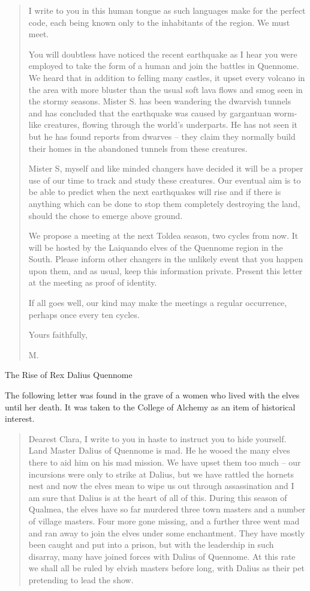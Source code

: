 \begin{multicols}{2}
\begin{quotation}
	I write to you in this human tongue as such languages make for the perfect code, each being known only to the inhabitants of the region.  We must meet.

	You will doubtless have noticed the recent earthquake as I hear you were employed to take the form of a human and join the battles in Quennome.  We heard that in addition to felling many castles, it upset every volcano in the area with more bluster than the usual soft lava flows and smog seen in the stormy seasons.  Mister S. has been wandering the dwarvish tunnels and has concluded that the earthquake was caused by gargantuan worm-like creatures, flowing through the world's underparts.  He has not seen it but he has found reports from dwarves -- they claim they normally build their homes in the abandoned tunnels from these creatures.

	Mister S, myself and like minded changers have decided it will be a proper use of our time to track and study these creatures.  Our eventual aim is to be able to predict when the next earthquakes will rise and if there is anything which can be done to stop them completely destroying the land, should the chose to emerge above ground.

	We propose a meeting at the next Toldea season, two cycles from now.  It will be hosted by the Laiquando elves of the Quennome region in the South.  Please inform other changers in the unlikely event that you happen upon them, and as usual, keep this information private.  Present this letter at the meeting as proof of identity.

	If all goes well, our kind may make the meetings a regular occurrence, perhaps once every ten cycles.

	Yours faithfully,

	M.
\end{quotation}

The Rise of Rex Dalius Quennome\label{h_dalius}

The following letter was found in the grave of a women who lived with the elves until her death.  It was taken to the College of Alchemy as an item of historical interest.

\begin{quotation}

Dearest Clara, I write to you in haste to instruct you to hide yourself.  Land Master Dalius of Quennome is mad.  He he wooed the many elves there to aid him on his mad mission.  We have upset them too much -- our incursions were only to strike at Dalius, but we have rattled the hornets nest and now the elves mean to wipe us out through assassination and I am sure that Dalius is at the heart of all of this.  During this season of Qualmea, the elves have so far murdered three town masters and a number of village masters.  Four more gone missing, and a further three went mad and ran away to join the elves under some enchantment.  They have mostly been caught and put into a prison, but with the leadership in such disarray, many have joined forces with Dalius of Quennome.  At this rate we shall all be ruled by elvish masters before long, with Dalius as their pet pretending to lead the show.


\end{quotation}
\end{multicols}
